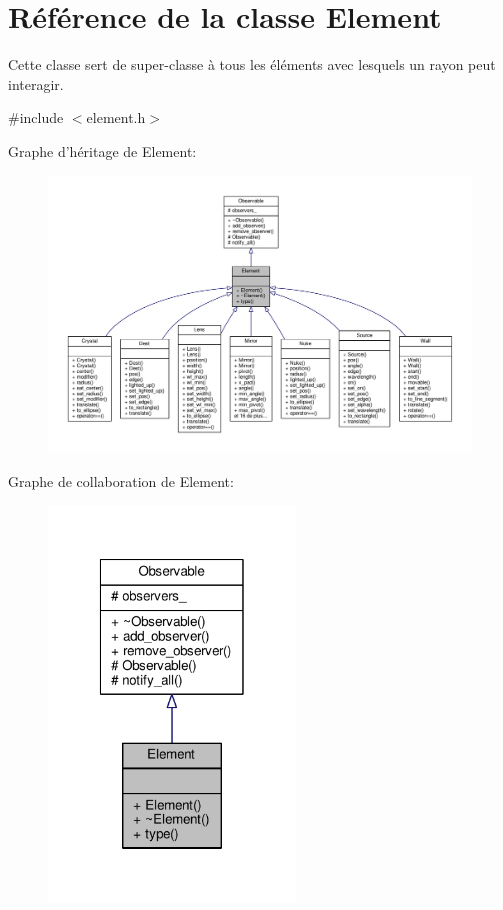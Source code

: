 \hypertarget{classElement}{\section{Référence de la classe Element}
\label{classElement}
}


Cette classe sert de super-\/classe à tous les éléments avec lesquels un rayon peut interagir.  




{\ttfamily \#include $<$element.\+h$>$}



Graphe d'héritage de Element\+:
\nopagebreak
\begin{figure}[H]
\begin{center}
\leavevmode
\includegraphics[width=350pt]{d8/dd6/classElement__inherit__graph}
\end{center}
\end{figure}


Graphe de collaboration de Element\+:
\nopagebreak
\begin{figure}[H]
\begin{center}
\leavevmode
\includegraphics[width=186pt]{d4/dd1/classElement__coll__graph}
\end{center}
\end{figure}
